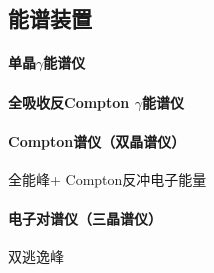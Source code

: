 \subsection{\textgamma 能谱装置}

\paragraph{单晶$\gamma$能谱仪}

\paragraph{全吸收反Compton $\gamma$能谱仪}

\paragraph{Compton谱仪（双晶谱仪）}
全能峰+ Compton反冲电子能量
\paragraph{电子对谱仪（三晶谱仪）}
双逃逸峰

